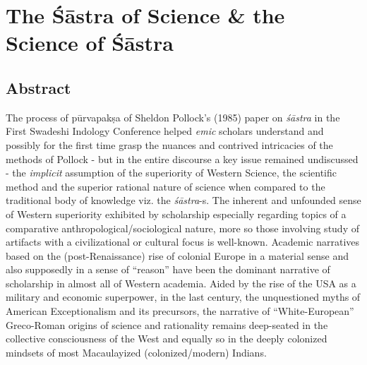 
\chapter{The Śāstra of Science \& the Science of Śāstra}


\vskip 2pt

\section*{Abstract}

\vskip 2pt

The process of pūrvapakṣa of Sheldon Pollock’s (1985) paper on \textit{śāstra} in the First Swadeshi Indology Conference helped \textit{emic} scholars understand and possibly for the first time grasp the nuances and contrived intricacies of the methods of Pollock - but in the entire discourse a key issue remained undiscussed - the \textit{implicit} assumption of the superiority of Western Science, the scientific method and the superior rational nature of science when compared to the traditional body of knowledge viz. the \textit{śāstra}-s. The inherent and unfounded sense of Western superiority exhibited by scholarship especially regarding topics of a comparative anthropological/sociological nature, more so those involving study of artifacts with a civilizational or cultural focus is well-known. Academic narratives based on the (post-Renaissance) rise of colonial Europe in a material sense and also supposedly in a sense of “reason” have been the dominant narrative of scholarship in almost all of Western academia. Aided by the rise of the USA as a military and economic superpower, in the last century, the unquestioned myths of American Exceptionalism and its precursors, the narrative of “White-European” Greco-Roman origins of science and rationality remains deep-seated in the collective consciousness of the West and equally so in the deeply colonized mindsets of most Macaulayized (colonized/modern) Indians.


